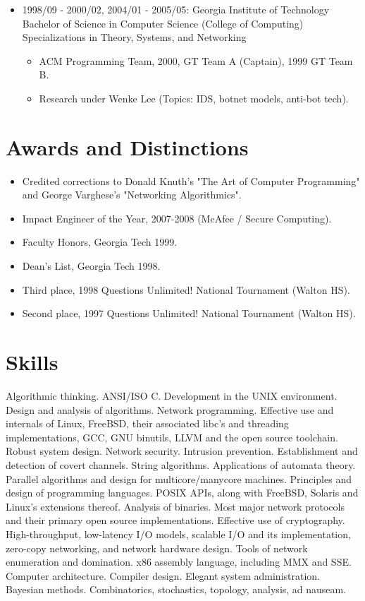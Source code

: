 \documentclass{article}
\newenvironment{tightitemize}
{\begin{itemize}
  \setlength{\itemsep}{1pt}
  \setlength{\parskip}{0pt}
  \setlength{\parsep}{0pt}}
{\end{itemize}}
\begin{document}
\begin{tightitemize}
\item 1998/09 - 2000/02, 2004/01 - 2005/05: Georgia Institute of Technology
Bachelor of Science in Computer Science (College of Computing)
Specializations in Theory, Systems, and Networking

\begin{tightitemize}
\item ACM Programming Team, 2000, GT Team A (Captain), 1999 GT Team B.
\item Research under Wenke Lee (Topics: IDS, botnet models, anti-bot tech).
\end{tightitemize}

\end{tightitemize}

\section{Awards and Distinctions}

\begin{tightitemize}
\item Credited corrections to Donald Knuth's "The Art of Computer Programming"
   and George Varghese's "Networking Algorithmics".
\item Impact Engineer of the Year, 2007-2008 (McAfee / Secure Computing).
\item Faculty Honors, Georgia Tech 1999.
\item Dean's List, Georgia Tech 1998.
\item Third place, 1998 Questions Unlimited! National Tournament (Walton HS).
\item Second place, 1997 Questions Unlimited! National Tournament (Walton HS).
\end{tightitemize}

\section{Skills}

Algorithmic thinking. ANSI/ISO C. Development in the UNIX environment. Design
and analysis of algorithms. Network programming. Effective use and internals
of Linux, FreeBSD, their associated libc's and threading implementations,
GCC, GNU binutils, LLVM and the open source toolchain. Robust system design.
Network security. Intrusion prevention. Establishment and detection of covert
channels. String algorithms. Applications of automata theory. Parallel
algorithms and design for multicore/manycore machines. Principles and design
of programming languages. POSIX APIs, along with FreeBSD, Solaris and Linux's
extensions thereof. Analysis of binaries. Most major network protocols and
their primary open source implementations. Effective use of cryptography.
High-throughput, low-latency I/O models, scalable I/O and its implementation,
zero-copy networking, and network hardware design. Tools of network
enumeration and domination. x86 assembly language, including MMX and SSE.
Computer architecture. Compiler design. Elegant system administration.
Bayesian methods. Combinatorics, stochastics, topology, analysis, ad nauseam.
\end{document}
